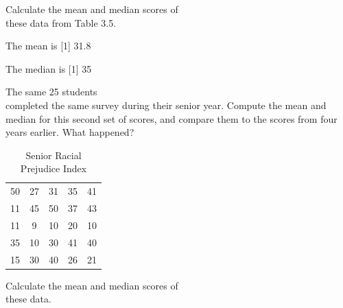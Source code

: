 \documentclass[11pt, chapterprefix=true]{scrbook}\usepackage[]{graphicx}\usepackage[]{color}
\begin{document}
\begin{exercises}
\begin{exercise}
\begin{table}[htbp]
{{   \label{tab:t3_12}
   }}
\end{table}

  Calculate the mean and median scores of \\ these data from Table 3.5.

	\vspace{2mm}
	\end{exercise}
	\begin{solution}   %

	The mean is
[1] 31.8


	The median is
[1] 35


	\end{solution}

	  \begin{exercise} %

The same 25 students \\ completed the same survey during their senior  year.  Compute the mean and median for this second set of scores, and compare them to the scores from four years earlier.   What happened?

\begin{table}[htbp]
   \centering
   {\small{
   \caption{Senior Racial Prejudice Index}
   \begin{tabular}{@{} ccccc  @{}} \hline %
   50 & 27 & 31 & 35 & 41 \\
   11 & 45 & 50 & 37 & 43 \\
   11 & 9  & 10 & 20 & 10 \\
   35 & 10 & 30 & 41 & 40 \\
   15 & 30 & 40 & 26 & 21 \\ \hline
   \end{tabular}
   }}
    
   \label{tab:t3_6a}
\end{table}

  Calculate the mean and median scores of \\ these data.

	\vspace{2mm}
	\end{exercise}
	\vspace{2mm}
	\begin{solution}   %




\end{solution}
\end{exercises}
\end{document}
